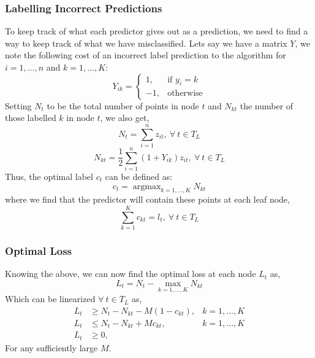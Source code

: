 \documentclass[11pt,a4paper]{report}
\DeclareMathOperator*{\argmaxB}{argmax}
\begin{document}
\subsubsection{Labelling Incorrect Predictions}
To keep track of what each predictor gives out as a prediction, we need to find a way to keep track of what we have misclassified.
Lets say we have a matrix $Y$, we note the following cost of an incorrect label prediction to the algorithm for $i = 1,\dots,n$ and $k = 1,\dots,K$:
\[
Y_{ik} = 
\begin{cases}
1, & \text{if } y_i = k\\
-1, & \text{otherwise}
\end{cases}
\]
Setting $N_t$ to be the total number of points in node $t$ and $N_{kt}$ the number of those labelled $k$ in node $t$, we also get,
\begin{equation}
    N_t = \sum_{i=1}^{n} z_{it}, \ \forall\ t \in T_L
    \label{eq:octnt}
\end{equation}
\begin{equation}
    N_{kt} = \frac{1}{2}\sum_{i=1}^{n} (1 + Y_{ik}) z_{it}, \ \forall\ t \in T_L
    \label{eq:octnkt}
\end{equation}
Thus, the optimal label $c_t$ can be defined as:
\[
c_t = \argmaxB_{k=1,\dots,K} N_{kt}
\label{eq:optimallabel}
\]
where we find that the predictor will contain these points at each leaf node,
\begin{equation}
\sum_{k=1}^{K} c_{kt} = l_t, \ \forall \ t \in T_L
\label{eq:octcontainpoints}
\end{equation}


\subsubsection{Optimal Loss}
Knowing the above, we can now find the optimal loss at each node $L_t$ as,
\[
L_t = N_t - \max_{k=1,\dots,K} N_{kt}
\]
Which can be linearized $\forall \ t \in T_L$ as,
\begin{align}
    L_t &\geq N_t - N_{kt} - M(1 - c_{kt}), & k=1,\dots,K \label{eq:octmiscl1}\\
    L_t &\leq N_t - N_{kt} + M c_{kt}, & k=1,\dots,K \label{eq:octmiscl2}\\
    L_t &\geq 0, &  \label{eq:octmiscl3}
\end{align}
For any sufficiently large $M$.
\end{document}
